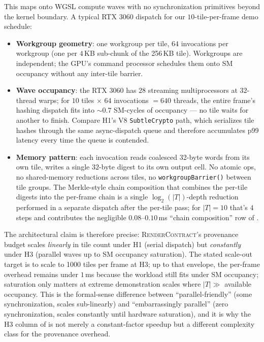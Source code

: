 \documentclass[sigconf,nonacm]{acmart}
\newcommand{\rendercontract}{\textsc{RenderContract}}
\begin{document}
This maps onto WGSL compute waves with no synchronization primitives
beyond the kernel boundary. A typical RTX 3060 dispatch for our
$10$-tile-per-frame demo schedule:

\begin{itemize}
  \item \textbf{Workgroup geometry}: one workgroup per tile, $64$
    invocations per workgroup (one per $4$\,KB sub-chunk of the
    256\,KB tile). Workgroups are independent; the GPU's command
    processor schedules them onto SM occupancy without any inter-tile
    barrier.
  \item \textbf{Wave occupancy}: the RTX 3060 has $28$ streaming
    multiprocessors at $32$-thread warps; for $10$ tiles
    $\times$ $64$ invocations $= 640$ threads, the entire frame's
    hashing dispatch fits into $\sim$$0.7$ SM-cycles of occupancy ---
    no tile waits for another to finish. Compare H1's V8
    \texttt{SubtleCrypto} path, which serializes tile hashes through
    the same async-dispatch queue and therefore accumulates p99
    latency every time the queue is contended.
  \item \textbf{Memory pattern}: each invocation reads coalesced
    32-byte words from its own tile, writes a single $32$-byte digest
    to its own output cell. No atomic ops, no shared-memory
    reductions across tiles, no \texttt{workgroupBarrier()} between
    tile groups. The Merkle-style chain composition that combines the
    per-tile digests into the per-frame chain is a single
    $\log_2(|T|)$-depth reduction performed in a separate dispatch
    after the per-tile pass; for $|T| = 10$ that's $4$ steps and
    contributes the negligible $0.08$--$0.10$\,ms ``chain composition''
    row of .
\end{itemize}

The architectural claim is therefore precise: \rendercontract{}'s
provenance budget scales \emph{linearly} in tile count under H1
(serial dispatch) but \emph{constantly} under H3 (parallel waves up to
SM occupancy saturation). The stated scale-out target is to scale to
1000 tiles per frame at H3; up to that envelope, the per-frame overhead
remains under $1$\,ms because
the workload still fits under SM occupancy; saturation only matters at
extreme demonstration scales where $|T| \gg$ available occupancy. This
is the formal-sense difference between ``parallel-friendly'' (some
synchronization, scales sub-linearly) and ``embarrassingly parallel''
(zero synchronization, scales constantly until hardware saturation),
and it is why the H3 column of  is not merely
a constant-factor speedup but a different complexity class for the
provenance overhead.
\end{document}
